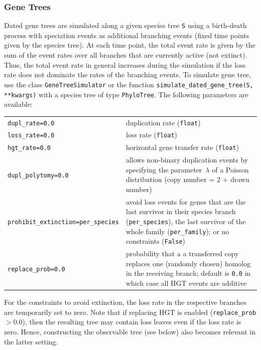 \documentclass[hidelinks,11pt]{article}
\newcommand{\sq}{\textquotesingle}
\begin{document}
\subsubsection{Gene Trees}

Dated gene trees are simulated along a given species tree \texttt{S} using a 
birth-death process \citep{kendall1948,gillespie1976} with speciation events as 
additional branching events (fixed time points given by the species tree). At 
each time point, the total event rate is given by the sum of the event rates 
over all branches that are currently active (not extinct).
Thus, the total event rate in general increases during the simulation if the 
loss rate does not dominate the rates of the branching events.
To simulate gene tree, use the class \texttt{GeneTreeSimulator} or the function 
\texttt{simulate\_dated\_gene\_tree(S, **kwargs)} with a species tree of type 
\texttt{PhyloTree}.
The following parameters are available:

\vspace{3mm}
{\small\centering
\begin{longtable}{ p{4.0cm} p{9cm} }
	\texttt{dupl\_rate=0.0} & duplication rate (\texttt{float})\\
  \texttt{loss\_rate=0.0} & loss rate (\texttt{float})\\
  \texttt{hgt\_rate=0.0} & horizontal gene transfer rate (\texttt{float})\\
	\texttt{dupl\_polytomy=0.0}  & allows non-binary duplication events by specifying
	the parameter~$\lambda$ of a Poisson distribution (copy number = 2 + drawn number)\\
	\texttt{prohibit\_extinction=\newline \sq per\_species\sq}  & avoid loss
	events for genes that are the last survivor in their species branch
	(\texttt{\sq per\_species\sq}), the last survivor of the whole family
	(\texttt{\sq per\_family\sq}); or no constraints  (\texttt{False})\\
  \texttt{replace\_prob=0.0} & probability that a a transferred copy replaces 
  one (randomly chosen) homolog in the receiving branch; default is 
  \texttt{0.0} in which case all HGT events are additive
\end{longtable}
}
\vspace{3mm}

\noindent
For the constraints to avoid extinction, the loss rate in the respective 
branches are temporarily set to zero.
Note that if replacing HGT is enabled (\texttt{replace\_prob} $>0.0$), then the 
resulting 
tree may contain loss leaves even if the loss rate is zero.
Hence, constructing the observable tree (see below) also becomes relevant in 
the latter setting.
\end{document}
